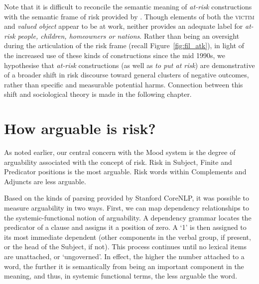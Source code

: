         Note that it is difficult to reconcile the semantic meaning of \emph{at-risk} constructions with the semantic frame of risk provided by . Though elements of both the \textsc{victim} and \emph{valued object} appear to be at work, neither provides an adequate label for \emph{at-risk people, children, homeowners or nations}. Rather than being an oversight during the articulation of the risk frame (recall Figure~\ref{fig:fil_atk}), in light of the increased use of these kinds of constructions since the mid 1990s, we hypothesise that \emph{at-risk} constructions (as well as \emph{to put at risk}) are demonstrative of a broader shift in risk discourse toward general clusters of negative outcomes, rather than specific and measurable potential harms. Connection between this shift and sociological theory is made in the following chapter.
        
	\section{How arguable is risk?} \label{sect:arguability}
	\FloatBarrier

		As noted earlier, our central concern with the Mood system is the degree of arguability associated with the concept of risk. Risk in Subject, Finite and Predicator positions is the most arguable. Risk words within Complements and Adjuncts are less arguable.


		Based on the kinds of parsing provided by Stanford CoreNLP, it was possible to measure arguability in two ways. First, we can map dependency relationships to the systemic-functional notion of arguability. A dependency grammar locates the predicator of a clause and assigns it a position of zero. A `1' is then assigned to its most immediate dependent (other components in the verbal group, if present, or the head of the Subject, if not). This process continues until no lexical items are unattached, or `ungoverned'. In effect, the higher the number attached to a word, the further it is semantically from being an important component in the meaning, and thus, in systemic functional terms, the less arguable the word.

